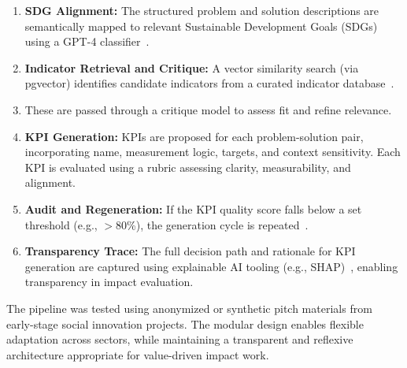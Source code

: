 \begin{enumerate}
    \item \textbf{SDG Alignment:} The structured problem and solution descriptions are semantically mapped to relevant Sustainable Development Goals (SDGs) using a GPT-4 classifier~\parencite{UNSDG2024}.

    \item \textbf{Indicator Retrieval and Critique:} A vector similarity search (via pgvector) identifies candidate indicators from a curated indicator database~\parencite{LCSimilaritySearch2025}.
    \item These are passed through a critique model to assess fit and refine relevance.

    \item \textbf{KPI Generation:} KPIs are proposed for each problem-solution pair, incorporating name, measurement logic, targets, and context sensitivity. Each KPI is evaluated using a rubric assessing clarity, measurability, and alignment.

    \item \textbf{Audit and Regeneration:} If the KPI quality score falls below a set threshold (e.g., $>$80\%), the generation cycle is repeated~\parencite{LCGraphBuilding2025}.

    \item \textbf{Transparency Trace:} The full decision path and rationale for KPI generation are captured using explainable AI tooling (e.g., SHAP)~\parencite{ShapXAI22025}, enabling transparency in impact evaluation.
\end{enumerate}

The pipeline was tested using anonymized or synthetic pitch materials from early-stage social innovation projects.
The modular design enables flexible adaptation across sectors, while maintaining a transparent and reflexive architecture appropriate for value-driven impact work.

